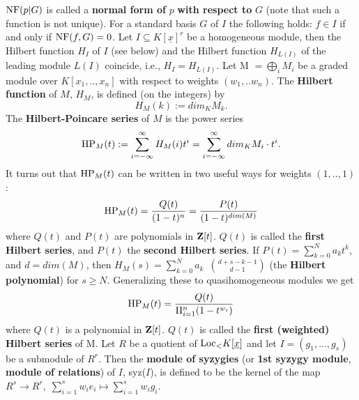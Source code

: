 \noindent
$\hbox{NF}(p|G)$ is called a {\bf normal form of} $p$ {\bf with
respect to} $G$ (note that such a function is not unique).
For a standard basis $G$ of $I$ the following holds: 
$f \in I$ if and only if $\hbox{NF}(f,G) = 0$.
Let \hbox{$I \subseteq K[\underline{x}]^r$} be a homogeneous module, then the Hilbert function
$H_I$ of $I$ (see below)
and the Hilbert function $H_{L(I)}$ of the leading module $L(I)$
coincide, i.e.,
$H_I=H_{L(I)}$.
Let M $=\bigoplus_i M_i$ be a graded module over $K[x_1,..,x_n]$ with 
respect to weights $(w_1,..w_n)$.
The {\bf Hilbert function} of $M$, $H_M$, is defined (on the integers) by
$$H_M(k) :=dim_K M_k.$$
The {\bf Hilbert-Poincare series}  of $M$ is the power series
$$\hbox{HP}_M(t) :=\sum_{i=-\infty}^\infty
H_M(i)t^i=\sum_{i=-\infty}^\infty dim_K M_i \cdot t^i.$$
It turns out that $\hbox{HP}_M(t)$ can be written in two useful ways
for weights $(1,..,1)$:
$$\hbox{HP}_M(t)={Q(t)\over (1-t)^n}={P(t)\over (1-t)^{dim(M)}}$$
where $Q(t)$ and $P(t)$ are polynomials in ${\bf Z}[t]$.
$Q(t)$ is called the {\bf first Hilbert series},
and $P(t)$ the {\bf second Hilbert series}.
If \hbox{$P(t)=\sum_{k=0}^N a_k t^k$}, and \hbox{$d = dim(M)$},
then \hbox{$H_M(s)=\sum_{k=0}^N a_k$ ${d+s-k-1}\choose{d-1}$}
(the {\bf Hilbert polynomial}) for $s \ge N$.
Generalizing these to quasihomogeneous modules we get
$$\hbox{HP}_M(t)={Q(t)\over {\Pi_{i=1}^n(1-t^{w_i})}}$$
where $Q(t)$ is a polynomial in ${\bf Z}[t]$.
$Q(t)$ is called the {\bf first (weighted) Hilbert series} of M.
Let $R$ be a quotient of $\hbox{Loc}_< K[\underline{x}]$ and let \hbox{$I=(g_1, ..., g_s)$} be a submodule of $R^r$.
Then the {\bf module of syzygies} (or {\bf 1st syzygy module}, {\bf module of relations}) of $I$, syz($I$), is defined to be the kernel of the map \hbox{$R^s \rightarrow R^r,\; \sum_{i=1}^s w_ie_i \mapsto \sum_{i=1}^s w_ig_i$.}
